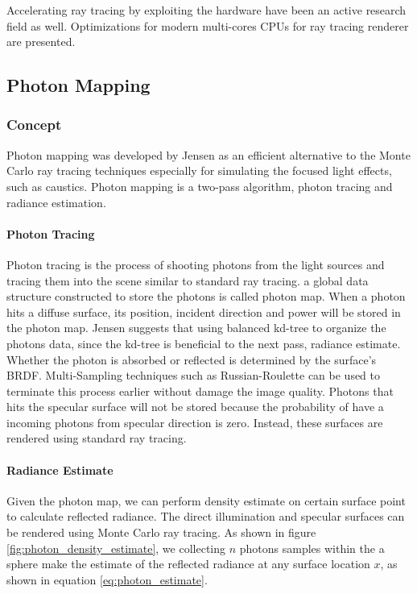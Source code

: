 Accelerating ray tracing by exploiting the hardware have been an active research field as well. Optimizations for modern multi-cores CPUs for ray tracing renderer are presented\cite{Wald:2002:IGI:581896.581899}. 

\subsection{Photon Mapping}


\subsubsection{Concept} 

Photon mapping was developed by Jensen \cite{HenrikWannJensen2004} as an efficient alternative to the Monte Carlo ray tracing techniques especially for simulating the focused light effects, such as caustics. Photon mapping is a two-pass algorithm, photon tracing and radiance estimation. 

\paragraph{Photon Tracing} 
Photon tracing is the process of shooting photons from the light sources and tracing them into the scene similar to standard ray tracing. a global data structure constructed to store the photons is called photon map. When a photon hits a diffuse surface, its position, incident direction and power will be stored in the photon map. Jensen suggests that using balanced kd-tree \cite{Bentley:1975:MBS:361002.361007} to organize the photons data, since the kd-tree is beneficial to the next pass, radiance estimate. Whether the photon is absorbed or reflected is determined by the surface's BRDF. Multi-Sampling techniques such as Russian-Roulette\cite{Neulander:2011:AIS:2037826.2037876} can be used to terminate this process earlier without damage the image quality. Photons that hits the specular surface will not be stored because the probability of have a incoming photons from specular direction is zero. Instead, these surfaces are rendered using standard ray tracing. 

\paragraph{Radiance Estimate}
Given the photon map, we can perform density estimate on certain surface point to calculate reflected radiance. The direct illumination and specular surfaces can be rendered using Monte Carlo ray tracing. As shown in figure \ref{fig:photon_density_estimate}, we collecting \(n\) photons samples within the a sphere make the estimate of the reflected radiance at any surface location \(x\), as shown in equation \ref{eq:photon_estimate}. 

